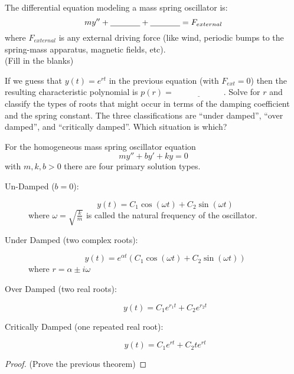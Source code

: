 \begin{problem}
    The differential equation modeling a mass spring oscillator is:
    \[ m y'' + \underline{\hspace{0.5in}} + \underline{\hspace{0.5in}}  = F_{external}
    \]
    where $F_{external}$ is any external driving force (like wind, periodic bumps to the
    spring-mass apparatus, magnetic fields, etc).\\
    (Fill in the blanks)
\end{problem}

\begin{problem}
    If we guess that $y(t) = e^{rt}$ in the previous equation (with $F_{ext} = 0$) then
    the resulting characteristic polynomial is $p(r) = \underline{\hspace{1in}}$.  Solve
    for $r$ and classify the types of roots that might occur in terms of the damping
    coefficient and the spring constant.  The three classifications are ``under damped'',
    ``over damped'', and ``critically damped''.  Which situation is which?
\end{problem}


\begin{thm}
    For the homogeneous mass spring oscillator equation 
    \[ my'' + by' + ky = 0 \]
    with $m, k, b > 0$ there are four primary solution types.
    \begin{description}
        \item[Un-Damped ($b = 0$):]
                \[ y(t) = C_1 \cos(\omega t) + C_2 \sin(\omega t) \]
                where $\omega = \sqrt{\frac{k}{m}}$ is called the natural frequency of the
                oscillator.
        \item[Under Damped (two complex roots):] 
            \[ y(t) = e^{\alpha t} \left( C_1 \cos(\omega t) + C_2
                \sin(\omega t) \right) \]
            where $r = \alpha \pm i \omega$
        \item[Over Damped (two real roots):] 
            \[y(t) = C_1 e^{r_1 t} + C_2 e^{r_2 t}\]
        \item[Critically Damped (one repeated real root):] 
            \[ y(t) = C_1 e^{rt} + C_2 t e^{rt} \]
    \end{description}
\end{thm}
\begin{proof}
    (Prove the previous theorem)
\end{proof}

